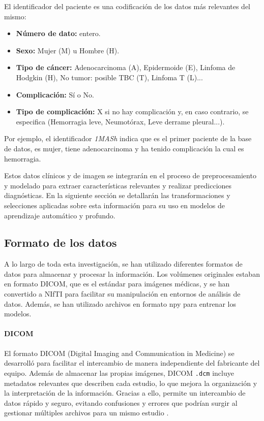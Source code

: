 El identificador del paciente es una codificación de los datos más relevantes del mismo:

\begin{itemize}
    \item \textbf{Número de dato:} entero.
    \item \textbf{Sexo:} Mujer (M) u Hombre (H).
    \item \textbf{Tipo de cáncer:} Adenocarcinoma (A), Epidermoide (E), Linfoma de Hodgkin (H), No tumor: posible TBC (T), Linfoma T (L)...
    \item \textbf{Complicación:} Sí o No.
    \item \textbf{Tipo de complicación:} X si no hay complicación y, en caso contrario, se especifica (Hemorragia leve, Neumotórax, Leve derrame pleural...).
\end{itemize}

Por ejemplo, el identificador \textit{1MASh} indica que es el primer paciente de la base de datos, es mujer, tiene adenocarcinoma y ha tenido complicación la cual es hemorragia.

Estos datos clínicos y de imagen se integrarán en el proceso de preprocesamiento y modelado para extraer características relevantes y realizar predicciones diagnósticas. En la siguiente sección se detallarán las transformaciones y selecciones aplicadas sobre esta información para su uso en modelos de aprendizaje automático y profundo.

\subsection{Formato de los datos}
A lo largo de toda esta investigación, se han utilizado diferentes formatos de datos para almacenar y procesar la información. Los volúmenes originales estaban en formato DICOM, que es el estándar para imágenes médicas, y se han convertido a NIfTI para facilitar su manipulación en entornos de análisis de datos. Además, se han utilizado archivos en formato npy para entrenar los modelos.

\paragraph{DICOM}
El formato DICOM (Digital Imaging and Communication in Medicine) se desarrolló para facilitar el intercambio de manera independiente del fabricante del equipo. Además de almacenar las propias imágenes, DICOM  \texttt{.dcm} incluye metadatos relevantes que describen cada estudio, lo que mejora la organización y la interpretación de la información. Gracias a ello, permite un intercambio de datos rápido y seguro, evitando confusiones y errores que podrían surgir al gestionar múltiples archivos para un mismo estudio \parencite{mustra2008overview}.


